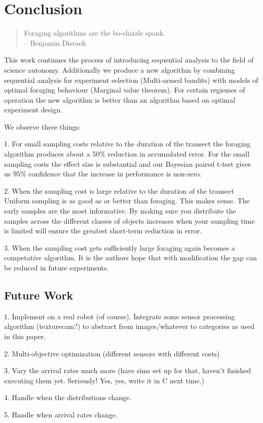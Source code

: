 \section{Conclusion}
\label{sec:conclusion}

\begin{quote}
	Foraging algorithms are the bo-shizzle spank.
	\\
	-- Benjamin Disraeli 
\end{quote}


This work continues the process of introducing sequential analysis to the field of science autonomy.  Additionally we produce a new algorithm by combining sequential analysis for experiment selection (Multi-armed bandits) with models of optimal foraging behaviour (Marginal value theorem).  For certain regiemes of operation the new algorithm is better than an algorithm based on optimal experiment design.

We observe three things:

1. For small sampling costs relative to the duration of the transect the foraging algorithm produces about a 50\% reduction in accumulated error.  For the small sampling costs the effect size is substantial and our Bayesian paired t-test gives us 95\% confidence that the increase in performance is non-zero.

2. When the sampling cost is large relative to the duration of the transect Uniform sampling is as good as or better than foraging.  This makes sense.  The early samples are the most informative.  By making sure you distribute the samples across the different classes of objects increases when your sampling time is limited will ensure the greatest short-term reduction in error.

3. When the sampling cost gets sufficiently large foraging again becomes a competative algorithm.  It is the authors hope that with modification the gap can be reduced in future experiments.


\subsection{Future Work}

1. Implement on a real robot (of course).  Integrate some sensor processing algorithm (texturecam?) to abstract from images/whatever to categories as used in this paper.

2. Multi-objective optimization (different sensors with different costs)

3. Vary the arrival rates much more (have sims set up for that, haven't finished executing them yet.  Seriously! Yes, yes, write it in C next time.)

4. Handle when the distributions change. 

5. Handle when arrival rates change.




